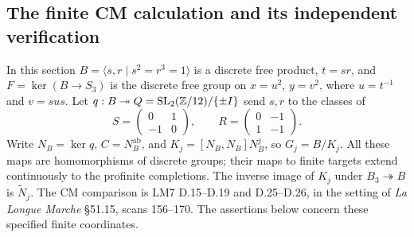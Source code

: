 \subsection{The finite CM calculation and its independent verification}

In this section $B=\langle s,r\mid s^2=r^3=1\rangle$ is a discrete
free product, $t=sr$, and $F=\ker(B\to S_3)$ is the discrete free
group on $x=u^2$, $y=v^2$, where $u=t^{-1}$ and $v=sus$.
Let $q:B\twoheadrightarrow Q=\mathrm{SL}_2(\mathbb Z/12)/\{\pm I\}$
send $s,r$ to the classes of
\[
 S=\begin{pmatrix}0&1\\-1&0\end{pmatrix},\qquad
 R=\begin{pmatrix}0&-1\\1&-1\end{pmatrix}.
\]
Write $N_B=\ker q$, $C=N_B^{\mathrm{ab}}$, and
$K_j=[N_B,N_B]N_B^j$, so $G_j=B/K_j$. All these maps are homomorphisms
of discrete groups; their maps to finite targets extend continuously
to the profinite completions. The inverse image of $K_j$ under
$B_3\twoheadrightarrow B$ is $\widetilde N_j$.
The CM comparison is LM7 D.15--D.19 and D.25--D.26, in the setting
of \emph{La Longue Marche} \S51.15, scans 156--170. The assertions
below concern these specified finite coordinates.

